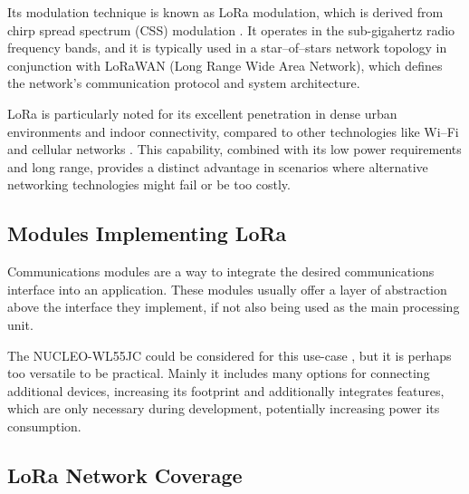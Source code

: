 Its modulation technique is known as LoRa modulation, which is derived from chirp spread spectrum (CSS) modulation \cite{semtech_corporation_sx12612_2024}. It operates in the sub-gigahertz radio frequency bands, and it is typically used in a star--of--stars network topology in conjunction with LoRaWAN (Long Range Wide Area Network), which defines the network's communication protocol and system architecture.

LoRa is particularly noted for its excellent penetration in dense urban environments and indoor connectivity, compared to other technologies like Wi--Fi and cellular networks \cite{stmicroelectronics_lora_2024,semtech_corporation_sx12612_2024,seeedstudio_wio-e5-wireless_2024}. This capability, combined with its low power requirements and long range, provides a distinct advantage in scenarios where alternative networking technologies might fail or be too costly.

\subsection{Modules Implementing LoRa}
Communications modules are a way to integrate the desired communications interface into an application. These modules usually offer a layer of abstraction above the interface they implement, if not also being used as the main processing unit.

The NUCLEO-WL55JC could be considered for this use-case \cite{stmicroelectronics_nucleo-wl55jc_2024}, but it is perhaps too versatile to be practical. Mainly it includes many options for connecting additional devices, increasing its footprint and additionally integrates features, which are only necessary during development, potentially increasing power its consumption.

\subsection{LoRa Network Coverage}

